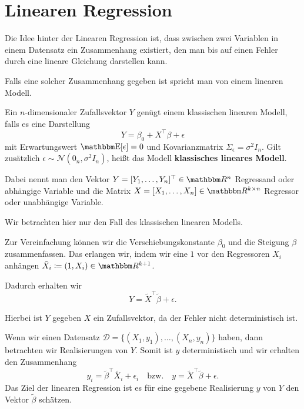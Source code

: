 \section{Linearen Regression}

Die Idee hinter der Linearen Regression ist, dass zwischen zwei Variablen in einem Datensatz ein Zusammenhang existiert, den man bis auf einen Fehler durch eine lineare Gleichung darstellen kann.

Falls eine solcher Zusammenhang gegeben ist spricht man von einem linearen Modell.
\begin{definition}
    Ein $n$-dimensionaler Zufallsvektor $Y$ genügt einem klassischen linearen Modell, falls es eine Darstellung
    \begin{equation}
        Y=\beta_0 + X^\top \beta+\epsilon
    \end{equation}
    mit Erwartungswert $\Ex[\epsilon]=0$ und Kovarianzmatrix $\Sigma_\epsilon=\sigma^2I_n$.\newline
    Gilt zusätzlich $\epsilon\sim\mathcal{N}(0_n, \sigma^2I_n)$, heißt das Modell \textbf{klassisches lineares Modell}.
\end{definition}
Dabei nennt man den Vektor $Y=[Y_1, \dots, Y_n]^\top\in\R^n$ Regressand oder abhängige Variable und die Matrix $X=[X_1, \dots, X_n]\in\R^{k\times n}$ Regressor oder unabhängige Variable.

Wir betrachten hier nur den Fall des klassischen linearen Modells.

Zur Vereinfachung können wir die Verschiebungskonstante $\beta_0$ und die Steigung $\beta$ zusammenfassen.
Das erlangen wir, indem wir eine $1$ vor den Regressoren $X_i$ anhängen $\tilde{X}_i\coloneqq(1, X_i)\in\R^{k+1}$.

Dadurch erhalten wir 
$$Y= \tilde{X}^\top \tilde{\beta}+\epsilon.$$


Hierbei ist $Y$ gegeben $X$ ein Zufallsvektor, da der Fehler nicht deterministisch ist.

Wenn wir einen Datensatz $\mathcal{D}=\{(X_1,y_1),\dots,(X_n,y_n)\}$ haben, dann betrachten wir Realisierungen von $Y$. Somit ist $y$ deterministisch und wir erhalten den Zusammenhang 
\begin{equation*}
    y_i=\tilde{\beta}^\top \tilde{X_i}+\epsilon_i  \quad\mathrm{bzw.}\quad y=\tilde{X}^\top\tilde{\beta}+\epsilon.
\end{equation*}
Das Ziel der linearen Regression ist es für eine gegebene Realisierung $y$ von $Y$ den Vektor $\tilde{\beta}$ schätzen.


